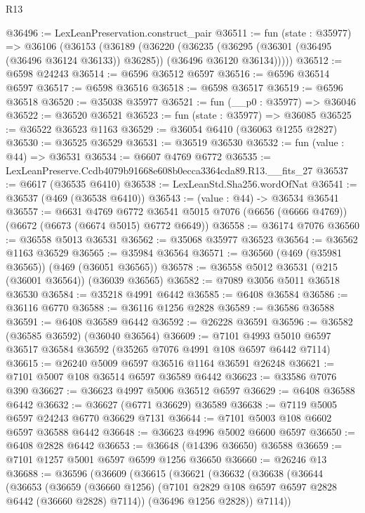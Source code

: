 \begin{lexlean}{R13}
\begin{coremodule}
@36496 := LexLeanPreservation.construct_pair
@36511 := fun (state : @35977) =>
  @36106
    (@36153
      (@36189
        (@36220
          (@36235
            (@36295 (@36301 (@36495 (@36496 @36124 @36133)) @36285))
            (@36496 @36120 @36134)))))
@36512 := @6598 @24243
@36514 := @6596 @36512 @6597
@36516 := @6596 @36514 @6597
@36517 := @6598 @36516
@36518 := @6598 @36517
@36519 := @6596 @36518
@36520 := @35038 @35977
@36521 := fun (__p0 : @35977) => @36046
@36522 := @36520 @36521
@36523 := fun (state : @35977) => @36085
@36525 := @36522 @36523 @1163
@36529 := @36054 @6410 (@36063 @1255 @2827)
@36530 := @36525 @36529
@36531 := @36519 @36530
@36532 := fun (value : @44) => @36531
@36534 := @6607 @4769 @6772
@36535 := LexLeanPreserve.Ccdb4079b91668e608b0ecca3364cda89.R13.__fits_27
@36537 := @6617 (@36535 @6410)
@36538 := LexLeanStd.Sha256.wordOfNat
@36541 := @36537 (@469 (@36538 @6410))
@36543 := (value : @44) -> @36534 @36541
@36557 := @6631
    @4769
    @6772
    @36541
    @5015
    @7076
    (@6656 (@6666 @4769))
    (@6672 (@6673 (@6674 @5015) @6772 @6649))
@36558 := @36174 @7076
@36560 := @36558 @5013 @36531
@36562 := @35068 @35977 @36523
@36564 := @36562 @1163 @36529
@36565 := @35984 @36564
@36571 := @36560 (@469 (@35981 @36565)) (@469 (@36051 @36565))
@36578 := @36558 @5012 @36531 (@215 (@36001 @36564)) (@36039 @36565)
@36582 := @7089 @3056 @5011 @36518 @36530
@36584 := @35218 @4991 @6442
@36585 := @6408 @36584
@36586 := @36116 @6770
@36588 := @36116 @1256 @2828
@36589 := @36586 @36588
@36591 := @6408 @36589 @6442
@36592 := @26228 @36591
@36596 := @36582 (@36585 @36592) (@36040 @36564)
@36609 := @7101 @4993 @5010 @6597 @36517 @36584 @36592 (@35265 @7076 @4991 @108 @6597 @6442 @7114)
@36615 := @26240 @5009 @6597 @36516 @1164 @36591 @26248
@36621 := @7101 @5007 @108 @36514 @6597 @36589 @6442
@36623 := @33586 @7076 @390
@36627 := @36623 @4997 @5006 @36512 @6597
@36629 := @6408 @36588 @6442
@36632 := @36627 (@6771 @36629) @36589
@36638 := @7119 @5005 @6597 @24243 @6770 @36629 @7131
@36644 := @7101 @5003 @108 @6602 @6597 @36588 @6442
@36648 := @36623 @4996 @5002 @6600 @6597
@36650 := @6408 @2828 @6442
@36653 := @36648 (@14396 @36650) @36588
@36659 := @7101 @1257 @5001 @6597 @6599 @1256 @36650
@36660 := @26246 @13
@36688 := @36596
    (@36609
      (@36615
        (@36621
          (@36632
            (@36638
              (@36644
                (@36653
                  (@36659
                    (@36660 @1256)
                    (@7101 @2829 @108 @6597 @6597 @2828 @6442 (@36660 @2828) @7114))
                  (@36496 @1256 @2828))
                @7114))

\end{coremodule}
\end{lexlean}
